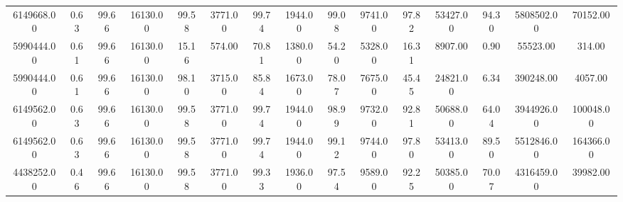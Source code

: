 \begin{table}
\begin{tabular}{ccccccccccccccc}
6149668.00& 0.63& 99.66& 16130.00& 99.58& 3771.00& 99.74& 1944.00& 99.08& 9741.00& 97.82& 53427.00& 94.30& 5808502.00& 70152.00\tabularnewline
5990444.00& 0.61& 99.66& 16130.00& 15.16& 574.00& 70.81& 1380.00& 54.20& 5328.00& 16.31& 8907.00& 0.90& 55523.00& 314.00\tabularnewline
5990444.00& 0.61& 99.66& 16130.00& 98.10& 3715.00& 85.84& 1673.00& 78.07& 7675.00& 45.45& 24821.00& 6.34& 390248.00& 4057.00\tabularnewline
6149562.00& 0.63& 99.66& 16130.00& 99.58& 3771.00& 99.74& 1944.00& 98.99& 9732.00& 92.81& 50688.00& 64.04& 3944926.00& 100048.00\tabularnewline
6149562.00& 0.63& 99.66& 16130.00& 99.58& 3771.00& 99.74& 1944.00& 99.12& 9744.00& 97.80& 53413.00& 89.50& 5512846.00& 164366.00\tabularnewline
4438252.00& 0.46& 99.66& 16130.00& 99.58& 3771.00& 99.33& 1936.00& 97.54& 9589.00& 92.25& 50385.00& 70.07& 4316459.00& 39982.00\tabularnewline
\end{tabular}
\end{table}
